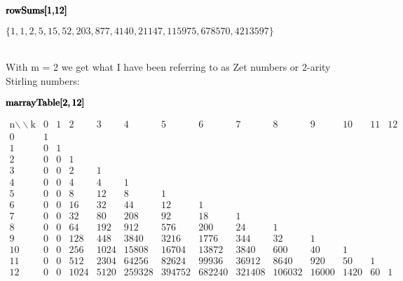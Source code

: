 \documentclass{article}
\begin{document}
\begin{doublespace}
\noindent\(\pmb{\text{rowSums}[1,}\\
\pmb{12]}\)
\end{doublespace}

\begin{doublespace}
\noindent\(\{1,1,2,5,15,52,203,877,4140,21147,115975,678570,4213597\}\)
\end{doublespace}

\\
With m = 2 we get what I have been referring to as Zet numbers or 2-arity Stirling numbers:



\begin{doublespace}
\noindent\(\pmb{\text{marrayTable}[}\\
\pmb{2,12]}\)
\end{doublespace}

\begin{doublespace}
\noindent\(\begin{array}{rrrrrrrrrrrrrr}
 \text{n$\backslash \backslash $k} & 0 & 1 & 2 & 3 & 4 & 5 & 6 & 7 & 8 & 9 & 10 & 11 & 12 \\
 0 & 1 & \text{} & \text{} & \text{} & \text{} & \text{} & \text{} & \text{} & \text{} & \text{} & \text{} & \text{} & \text{} \\
 1 & 0 & 1 & \text{} & \text{} & \text{} & \text{} & \text{} & \text{} & \text{} & \text{} & \text{} & \text{} & \text{} \\
 2 & 0 & 0 & 1 & \text{} & \text{} & \text{} & \text{} & \text{} & \text{} & \text{} & \text{} & \text{} & \text{} \\
 3 & 0 & 0 & 2 & 1 & \text{} & \text{} & \text{} & \text{} & \text{} & \text{} & \text{} & \text{} & \text{} \\
 4 & 0 & 0 & 4 & 4 & 1 & \text{} & \text{} & \text{} & \text{} & \text{} & \text{} & \text{} & \text{} \\
 5 & 0 & 0 & 8 & 12 & 8 & 1 & \text{} & \text{} & \text{} & \text{} & \text{} & \text{} & \text{} \\
 6 & 0 & 0 & 16 & 32 & 44 & 12 & 1 & \text{} & \text{} & \text{} & \text{} & \text{} & \text{} \\
 7 & 0 & 0 & 32 & 80 & 208 & 92 & 18 & 1 & \text{} & \text{} & \text{} & \text{} & \text{} \\
 8 & 0 & 0 & 64 & 192 & 912 & 576 & 200 & 24 & 1 & \text{} & \text{} & \text{} & \text{} \\
 9 & 0 & 0 & 128 & 448 & 3840 & 3216 & 1776 & 344 & 32 & 1 & \text{} & \text{} & \text{} \\
 10 & 0 & 0 & 256 & 1024 & 15808 & 16704 & 13872 & 3840 & 600 & 40 & 1 & \text{} & \text{} \\
 11 & 0 & 0 & 512 & 2304 & 64256 & 82624 & 99936 & 36912 & 8640 & 920 & 50 & 1 & \text{} \\
 12 & 0 & 0 & 1024 & 5120 & 259328 & 394752 & 682240 & 321408 & 106032 & 16000 & 1420 & 60 & 1 \\
\end{array}\)
\end{doublespace}
\end{document}
